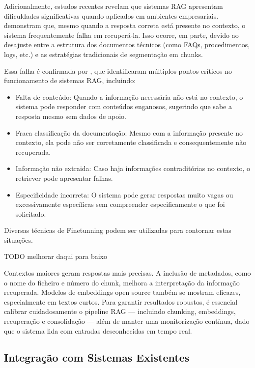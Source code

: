 Adicionalmente, estudos recentes revelam que sistemas RAG apresentam dificuldades significativas quando aplicados em ambientes empresariais. \textcite{RAGDoesNotWork2024} demonstram que, mesmo quando a resposta correta está presente no contexto, o sistema frequentemente falha em recuperá-la. Isso ocorre, em parte, devido ao desajuste entre a estrutura dos documentos técnicos (como FAQs, procedimentos, logs, etc.) e as estratégias tradicionais de segmentação em chunks.

Essa falha é confirmada por \textcite{SevenPoints2024}, que identificaram múltiplos pontos críticos no funcionamento de sistemas RAG, incluindo:

\begin{itemize}
    \item Falta de conteúdo: Quando a informação necessária não está no contexto, o sistema pode responder com conteúdos enganosos, sugerindo que sabe a resposta mesmo sem dados de apoio.
    \item Fraca classificação da documentação: Mesmo com a informação presente no contexto, ela pode não ser corretamente classificada e consequentemente não recuperada. 
 \item Informação não extraida: Caso haja informações contraditórias no contexto, o retriever pode apresentar falhas.
  \item Especificidade incorreta: O sistema pode gerar respostas muito vagas ou excessivamente específicas sem compreender especificamente o que foi solicitado.
\end{itemize}

Diversas técnicas de Finetunning podem ser utilizadas para contornar estas situações.

TODO melhorar daqui para baixo

Contextos maiores geram respostas mais precisas. A inclusão de metadados, como o nome do ficheiro e número do chunk, melhora a interpretação da informação recuperada. Modelos de embeddings open source também se mostram eficazes, especialmente em textos curtos. Para garantir resultados robustos, é essencial calibrar cuidadosamente o pipeline RAG — incluindo chunking, embeddings, recuperação e consolidação — além de manter uma monitorização contínua, dado que o sistema lida com entradas desconhecidas em tempo real.



\subsection{Integração com Sistemas Existentes}




